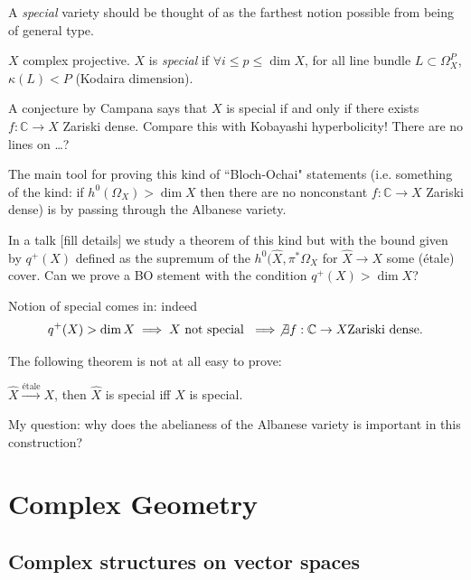 \documentclass{book}
\begin{document}
A \textit{special} variety should be thought
of
as the farthest notion possible from being of
general type.

\begin{definition}[Campana]
$X$ complex projective.
$X$ is \textit{special} if $\forall i \leq  p
\leq \dim X$,
for all line bundle $L \subset \Omega^P_X$,
$\kappa(L)<P$ (Kodaira dimension).
\end{definition}

\noindent
A conjecture by Campana says that
$X$ is special if and only if there exists
$f:\mathbb{C}\to X$
Zariski dense.
Compare this with Kobayashi hyperbolicity!
There are no lines on …?

The main tool for proving this kind of
``Bloch-Ochai" statements (i.e.
something of the kind: if $h^0(\Omega_X)>
\dim X$
then there are no nonconstant
$f:\mathbb{C}\to X$
Zariski dense)
is by passing through the Albanese variety.

In a talk [fill details]
we study a theorem of this kind but with the
bound
given by $q^+(X)$ defined as the supremum of
the $h^0(\hat{X},\pi^*\Omega_{X}$
for $\hat{X}\to X$ some (étale) cover.
Can we prove a BO stement with the condition
$q^+(X)>\dim X$?

Notion of special comes in: indeed
 $$
q^+(X)>\dim X \implies X \text{ not special
}\implies
\not\exists f:\mathbb{C}\to X \text{Zariski
dense}.
$$

The following theorem is not at all easy to
prove:
\begin{theorem}[Campana]
\label{theorem-campana}
$\hat{X}\xrightarrow{\text{étale} }X$, then
$\hat{X}$ is special iff $X$ is special.
\end{theorem}

\noindent
My question: why does the abelianess of
the Albanese variety is important in this
construction?






\chapter{Complex Geometry}
\label{chapter-complex-geometry}





\section{Complex structures on vector spaces}
\label{section-complex-structure}
\end{document}
